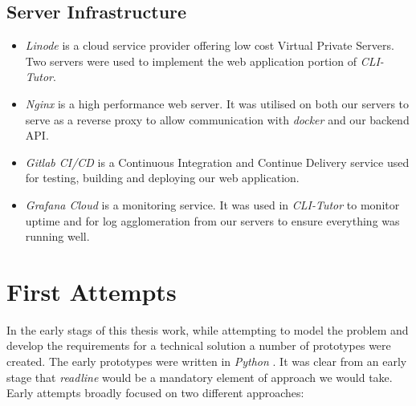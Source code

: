 \subsection{Server Infrastructure}
\begin{itemize}
    \item \textit{Linode} is a cloud service provider offering low cost Virtual Private Servers. Two servers were used to implement the web application portion of \textit{CLI-Tutor}.
    \item \textit{Nginx} is a high performance web server. It was utilised on
        both our servers to serve as a reverse proxy to allow communication
        with \textit{docker} and our backend API.
    \item \textit{Gitlab CI/CD} is a Continuous Integration and Continue Delivery service used for testing, building and deploying our web application.
    \item \textit{Grafana Cloud} is a monitoring service. It was used in
        \textit{CLI-Tutor} to monitor uptime and for log agglomeration from our
        servers to ensure everything was running well.
\end{itemize}

\section{First Attempts} In the early stags of this thesis work, while
attempting to model the problem and develop the requirements for a technical
solution a number of prototypes were created. The early prototypes were written
in \textit{Python} \cite{python}. It was clear from an early stage that
\textit{readline} would be a mandatory element of approach we would take. Early
attempts broadly focused on two different approaches:

